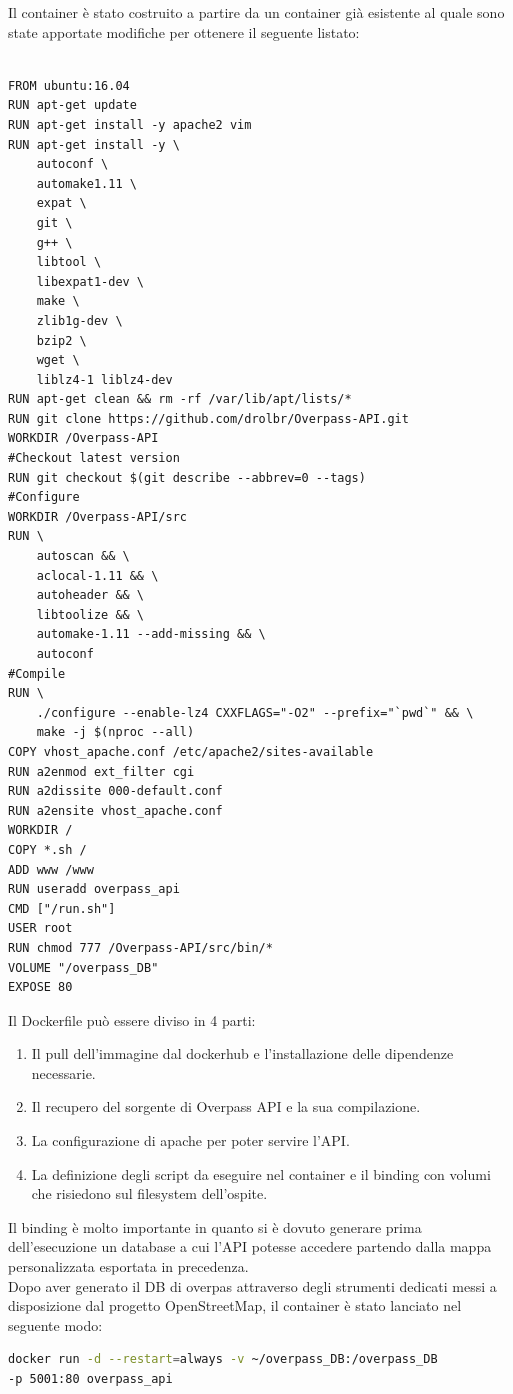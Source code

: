 Il container è stato costruito a partire da un container già esistente\cite{OverpassDocker} al quale sono state apportate modifiche per ottenere il seguente listato:
\begin{lstlisting}[caption={Dockerfile per OverpassAPI},captionpos=b,language=docker]

FROM ubuntu:16.04
RUN apt-get update 
RUN apt-get install -y apache2 vim
RUN apt-get install -y \
	autoconf \
	automake1.11 \
	expat \
	git \
	g++ \
	libtool \
	libexpat1-dev \
	make \
	zlib1g-dev \
	bzip2 \
	wget \
	liblz4-1 liblz4-dev
RUN apt-get clean && rm -rf /var/lib/apt/lists/*
RUN git clone https://github.com/drolbr/Overpass-API.git
WORKDIR /Overpass-API
#Checkout latest version
RUN git checkout $(git describe --abbrev=0 --tags)
#Configure
WORKDIR /Overpass-API/src
RUN \
	autoscan && \
	aclocal-1.11 && \
	autoheader && \
	libtoolize && \
	automake-1.11 --add-missing && \
	autoconf
#Compile
RUN \
	./configure --enable-lz4 CXXFLAGS="-O2" --prefix="`pwd`" && \
	make -j $(nproc --all)
COPY vhost_apache.conf /etc/apache2/sites-available
RUN a2enmod ext_filter cgi
RUN a2dissite 000-default.conf
RUN a2ensite vhost_apache.conf
WORKDIR /
COPY *.sh /
ADD www /www
RUN useradd overpass_api
CMD ["/run.sh"]
USER root
RUN chmod 777 /Overpass-API/src/bin/*
VOLUME "/overpass_DB"
EXPOSE 80
\end{lstlisting}
\vspace{5mm}
Il Dockerfile può essere diviso in 4 parti:
\begin{enumerate}
    \item Il pull dell'immagine dal dockerhub e l'installazione delle dipendenze necessarie.
    \item Il recupero del sorgente di Overpass API e la sua compilazione.
    \item La configurazione di apache per poter servire l'API.
    \item La definizione degli script da eseguire nel container e il binding con volumi che risiedono sul filesystem dell'ospite.
\end{enumerate}

Il binding è molto importante in quanto si è dovuto generare prima dell'esecuzione un database a cui l'API potesse accedere partendo dalla mappa personalizzata esportata in precedenza.\\
Dopo aver generato il DB di overpas attraverso degli strumenti dedicati messi a disposizione dal progetto OpenStreetMap, il container è stato lanciato nel seguente modo:

\begin{lstlisting}[language=bash]
docker run -d --restart=always -v ~/overpass_DB:/overpass_DB 
-p 5001:80 overpass_api 
\end{lstlisting}

